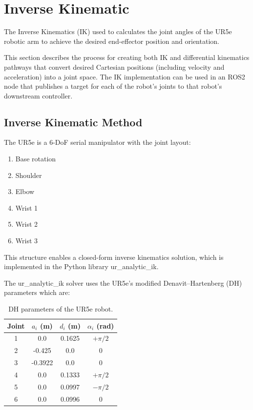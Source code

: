 \newpage

\section{Inverse Kinematic}

The Inverse Kinematics (IK) used to calculates the joint angles of the UR5e robotic arm to achieve the desired end-effector position and orientation.

This section describes the process for creating both IK and differential kinematics pathways that convert desired Cartesian positions (including velocity and acceleration) into a joint space. The IK implementation can be used in an ROS2 node that publishes a target for each of the robot's joints to that robot's downstream controller.

\subsection{Inverse Kinematic Method}

The UR5e is a 6-DoF serial manipulator with the joint layout:

\begin{enumerate}
    \item Base rotation
    \item Shoulder
    \item Elbow
    \item Wrist 1
    \item Wrist 2
    \item Wrist 3
\end{enumerate}

This structure enables a closed-form inverse kinematics solution, which is implemented in the Python library ur\_analytic\_ik.

The ur\_analytic\_ik solver uses the UR5e’s modified Denavit–Hartenberg (DH) parameters which are:

\begin{table}[h!]
\centering
\begin{tabular}{c c c c}
\hline
\textbf{Joint} & $a_i$ (m) & $d_i$ (m) & $\alpha_i$ (rad) \\
\hline
1 & 0.0     & 0.1625  & $+\pi/2$ \\
2 & -0.425  & 0.0     & $0$      \\
3 & -0.3922 & 0.0     & $0$      \\
4 & 0.0     & 0.1333  & $+\pi/2$ \\
5 & 0.0     & 0.0997  & $-\pi/2$ \\
6 & 0.0     & 0.0996  & $0$      \\
\hline
\end{tabular}
\caption{DH parameters of the UR5e robot.}
\end{table}

